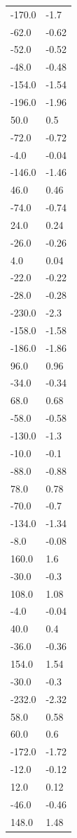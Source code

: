 \begin{longtable}{ll}
-170.0 & -1.7 \\
-62.0 & -0.62 \\
-52.0 & -0.52 \\
-48.0 & -0.48 \\
-154.0 & -1.54 \\
-196.0 & -1.96 \\
50.0 & 0.5 \\
-72.0 & -0.72 \\
-4.0 & -0.04 \\
-146.0 & -1.46 \\
46.0 & 0.46 \\
-74.0 & -0.74 \\
24.0 & 0.24 \\
-26.0 & -0.26 \\
4.0 & 0.04 \\
-22.0 & -0.22 \\
-28.0 & -0.28 \\
-230.0 & -2.3 \\
-158.0 & -1.58 \\
-186.0 & -1.86 \\
96.0 & 0.96 \\
-34.0 & -0.34 \\
68.0 & 0.68 \\
-58.0 & -0.58 \\
-130.0 & -1.3 \\
-10.0 & -0.1 \\
-88.0 & -0.88 \\
78.0 & 0.78 \\
-70.0 & -0.7 \\
-134.0 & -1.34 \\
-8.0 & -0.08 \\
160.0 & 1.6 \\
-30.0 & -0.3 \\
108.0 & 1.08 \\
-4.0 & -0.04 \\
40.0 & 0.4 \\
-36.0 & -0.36 \\
154.0 & 1.54 \\
-30.0 & -0.3 \\
-232.0 & -2.32 \\
58.0 & 0.58 \\
60.0 & 0.6 \\
-172.0 & -1.72 \\
-12.0 & -0.12 \\
12.0 & 0.12 \\
-46.0 & -0.46 \\
148.0 & 1.48 \\

\end{longtable}
